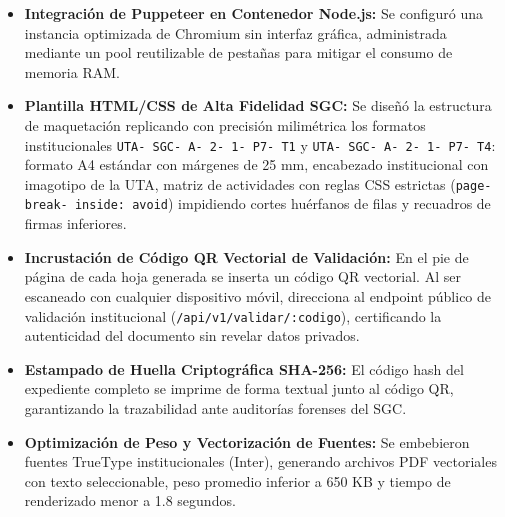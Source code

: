 \documentclass[12pt,a4paper]{article}
\begin{document}
\begin{itemize}[leftmargin=1.5em, itemsep=4pt]
    \item \textbf{Integración de Puppeteer en Contenedor Node.js:} Se configuró una instancia optimizada de Chromium sin interfaz gráfica, administrada mediante un pool reutilizable de pestañas para mitigar el consumo de memoria RAM.
    \item \textbf{Plantilla HTML/CSS de Alta Fidelidad SGC:} Se diseñó la estructura de maquetación replicando con precisión milimétrica los formatos institucionales \texttt{UTA- SGC- A- 2- 1- P7- T1} y \texttt{UTA- SGC- A- 2- 1- P7- T4}: formato A4 estándar con márgenes de 25 mm, encabezado institucional con imagotipo de la UTA, matriz de actividades con reglas CSS estrictas (\texttt{page- break- inside: avoid}) impidiendo cortes huérfanos de filas y recuadros de firmas inferiores.
    \item \textbf{Incrustación de Código QR Vectorial de Validación:} En el pie de página de cada hoja generada se inserta un código QR vectorial. Al ser escaneado con cualquier dispositivo móvil, direcciona al endpoint público de validación institucional (\texttt{/\allowbreak  api/\allowbreak  v1/\allowbreak  validar/\allowbreak  :codigo}), certificando la autenticidad del documento sin revelar datos privados.
    \item \textbf{Estampado de Huella Criptográfica SHA-256:} El código hash del expediente completo se imprime de forma textual junto al código QR, garantizando la trazabilidad ante auditorías forenses del SGC.
    \item \textbf{Optimización de Peso y Vectorización de Fuentes:} Se embebieron fuentes TrueType institucionales (Inter), generando archivos PDF vectoriales con texto seleccionable, peso promedio inferior a 650 KB y tiempo de renderizado menor a 1.8 segundos.
\end{itemize}
\end{document}
